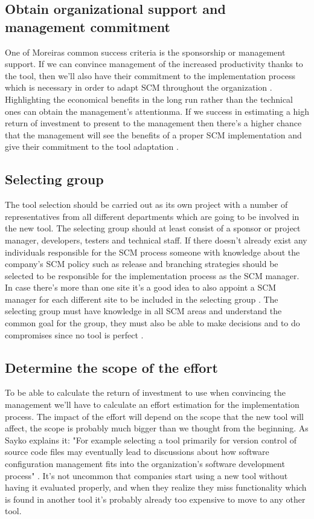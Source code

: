 \documentclass[10pt]{article}
\begin{document}
\subsection{Obtain organizational support and management commitment}
One of Moreiras \cite{Moreira} common success criteria is the sponsorship or management support. If we can convince management of the increased productivity thanks to the tool, then we'll also have their commitment to the implementation process which is necessary in order to adapt SCM throughout the organization \cite{Sayko}. Highlighting the economical benefits in the long run rather than the technical ones can obtain the management’s attentionma. If we success in estimating a high return of investment to present to the management then there's a higher chance that the management will see the benefits of a proper SCM implementation and give their commitment to the tool adaptation \cite{Sayko}. 

\subsection{Selecting group}
The tool selection should be carried out as its own project with a number of representatives from all different departments which are going to be involved in the new tool. The selecting group should at least consist of a sponsor or project manager, developers, testers and technical staff\cite{Sayko}. If there doesn't already exist any individuals responsible for the SCM process someone with knowledge about the company's SCM policy such as release and branching strategies should be selected to be responsible for the implementation process as the SCM manager. In case there's more than one site it's a good idea to also appoint a SCM manager for each different site to be included in the selecting group \cite{ABB}. The selecting group must have knowledge in all SCM areas and understand the common goal for the group, they must also be able to make decisions and to do compromises since no tool is perfect \cite{Sayko}.

\subsection{Determine the scope of the effort}
To be able to calculate the return of investment to use when convincing the management we'll have to calculate an effort estimation for the implementation process. The impact of the effort will depend on the scope that the new tool will affect, the scope is probably much bigger than we thought from the beginning. As Sayko explains it: "For example selecting a tool primarily for version control of source code files may eventually lead to discussions about how software configuration management fits into the organization's software development process" \cite{Sayko}. It's not uncommon that companies start using a new tool without having it evaluated properly, and when they realize they miss functionality which is found in another tool it's probably already too expensive to move to any other tool.
\end{document}
